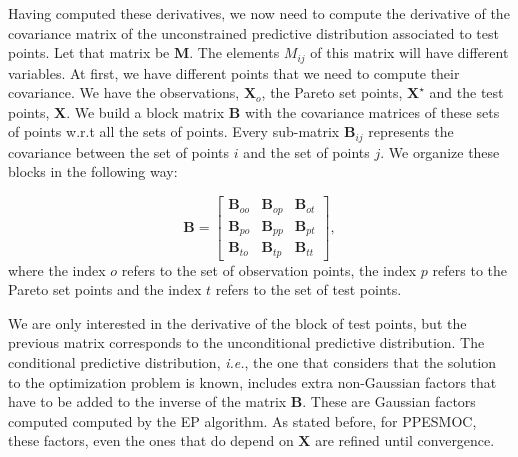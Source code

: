 Having computed these derivatives, we now need to compute the derivative of the covariance matrix of the unconstrained predictive distribution associated to test points. Let that matrix be $\mathbf{M}$. The elements $M_{ij}$ of this matrix will have different variables. At first, we have different points that we need to compute their covariance. We have the observations, $\mathbf{X}_o$, the Pareto set points, $\mathbf{X}^\star$ and the test points, $\mathbf{X}$. We build a block matrix $\mathbf{B}$ with the covariance matrices of these sets of points w.r.t all the sets of points. Every sub-matrix $\mathbf{B}_{ij}$ represents the covariance between the set of points $i$ and the set of points $j$. We organize these blocks in the following way:

\[
\mathbf{B}=
\left[
\begin{array}{c|c|c}
\mathbf{B}_{oo} & \mathbf{B}_{op} & \mathbf{B}_{ot}\\
\hline
\mathbf{B}_{po} & \mathbf{B}_{pp} & \mathbf{B}_{pt}\\
\hline
\mathbf{B}_{to} & \mathbf{B}_{tp} & \mathbf{B}_{tt}
\end{array}
\right],
\]
where the index $o$ refers to the set of observation points, the index $p$ refers to the Pareto set points and the index $t$ refers to the set of test points.

We are only interested in the derivative of the block of test points, but the previous matrix corresponds to the unconditional predictive distribution. The conditional predictive distribution, \emph{i.e.}, the one that considers that the solution to the optimization problem is known, includes extra non-Gaussian factors that have to be added to the inverse of the matrix $\mathbf{B}$. These are Gaussian factors computed computed by the EP algorithm. As stated before, for PPESMOC, these factors, even the ones that do depend on $\mathbf{X}$ are refined until convergence.

